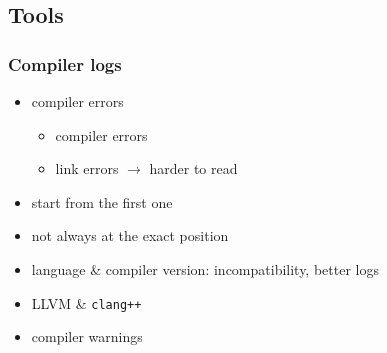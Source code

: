 
\subsection{Tools}

\begin{frame}
    \frametitle{Compiler logs}
    \begin{itemize}[<+->]
        \item compiler errors
        \begin{itemize}[<+->]
            \item compiler errors
            \item link errors \onslide<+-> $\longrightarrow$ harder to read
        \end{itemize}
        \item start from the first one
        \item not always at the exact position
        \item language \& compiler version\onslide<+->: incompatibility\onslide<+->, better logs
        \item LLVM \& \texttt{clang++}
        \item compiler warnings
    \end{itemize}
\end{frame}

